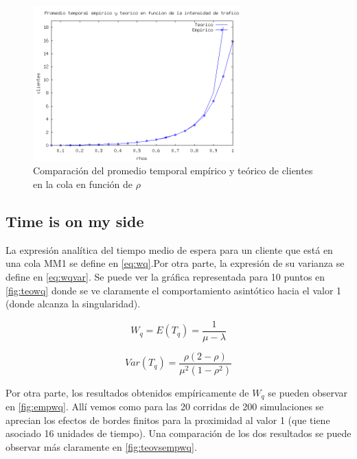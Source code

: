 \documentclass{sig-alternate}
\begin{document}
\begin{figure}[ht]
\begin{center}
\includegraphics[width=8cm]{teoricoVSempirico}
\caption{\label{fig:meanQueueVS} Comparaci\'on del promedio temporal emp\'irico y te\'orico de clientes en la cola en funci\'on de $\rho$}
\end{center}
\end{figure}

\newpage

\subsection{Time is on my side}
\label{sec:parte2}

La expresión analítica del tiempo medio de espera para un cliente que está en una cola MM1 se define en  \eqref{eq:wq}.Por otra parte, la expresión de su varianza se define en \eqref{eq:wqvar}. Se puede ver la gráfica representada para 10 puntos en \ref{fig:teowq} donde se ve claramente el comportamiento asintótico hacia el valor 1 (donde alcanza la singularidad).

\begin{equation}
\label{eq:wq}
  W_q = E (T_q)= \frac{1}{\mu-\lambda}
\end{equation}

\begin{equation}
\label{eq:wqvar}
  Var(T_q) = \frac{\rho(2-\rho)}{\mu^2(1-\rho^2)}
\end{equation}

Por otra parte, los resultados obtenidos empíricamente de $W_q$ se pueden observar en \ref{fig:empwq}. Allí vemos como para las 20 corridas de 200 simulaciones se aprecian los efectos de bordes finitos para la proximidad al valor 1 (que tiene asociado 16 unidades de tiempo). Una comparación de los dos resultados se puede observar más claramente en \ref{fig:teovsempwq}.
\end{document}
